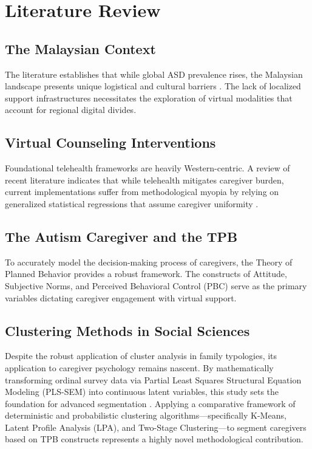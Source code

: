 \chapter{Literature Review}

\section{The Malaysian Context}
The literature establishes that while global ASD prevalence rises, the Malaysian landscape presents unique logistical and cultural barriers \citep{Lim2021_79, Ng2021_114}. The lack of localized support infrastructures necessitates the exploration of virtual modalities that account for regional digital divides.

\section{Virtual Counseling Interventions}
Foundational telehealth frameworks are heavily Western-centric. A review of recent literature indicates that while telehealth mitigates caregiver burden, current implementations suffer from methodological myopia by relying on generalized statistical regressions that assume caregiver uniformity \citep{Malgaroli2023_92, Kolog2018_108}.

\section{The Autism Caregiver and the TPB}
To accurately model the decision-making process of caregivers, the Theory of Planned Behavior \citep{ajzen1991} provides a robust framework. The constructs of Attitude, Subjective Norms, and Perceived Behavioral Control (PBC) serve as the primary variables dictating caregiver engagement with virtual support.

\section{Clustering Methods in Social Sciences}
Despite the robust application of cluster analysis in family typologies, its application to caregiver psychology remains nascent. By mathematically transforming ordinal survey data via Partial Least Squares Structural Equation Modeling (PLS-SEM) into continuous latent variables, this study sets the foundation for advanced segmentation \citep{Lanza2003_71}. Applying a comparative framework of deterministic and probabilistic clustering algorithms—specifically K-Means, Latent Profile Analysis (LPA), and Two-Stage Clustering—to segment caregivers based on TPB constructs represents a highly novel methodological contribution.
